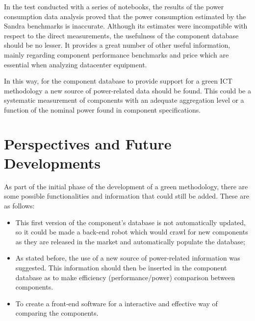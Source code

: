     
    In the test conducted with a series of notebooks, the results of the power consumption data analysis proved that the power consumption estimated by the Sandra benchmarks is inaccurate. Although its estimates were incompatible with respect to the direct measurements, the usefulness of the component database should be no lesser. It provides a great number of other useful information, mainly regarding component performance benchmarks and price which are essential when analyzing datacenter equipment.
    
    In this way, for the component database to provide support for a green ICT methodology a new source of power-related data should be found. This could be a systematic measurement of components with an adequate aggregation level or a function of the nominal power found in component specifications.
    
    \pagebreak
    \section{Perspectives and Future Developments}

        As part of the initial phase of the development of a green methodology, there are some possible functionalities and information that could still be added. These are as follows:
    \begin{itemize}
	    \item This first version of the component's database is not automatically updated, so it could be made a back-end robot which would crawl for new components as they are released in the market and automatically populate the database;
	    \item As stated before, the use of a new source of power-related information was suggested. This information should then be inserted in the component database as to make efficiency (performance/power) comparison between components.
	    \item To create a front-end software for a interactive and effective way of comparing the components.
    \end{itemize}







